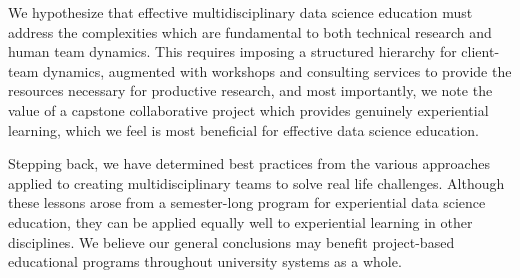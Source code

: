 \documentclass[12pt]{article}
\begin{document}
We hypothesize that effective multidisciplinary data science education must address the complexities which are fundamental to both technical research and human team dynamics. This requires imposing a structured hierarchy for client-team dynamics, augmented with workshops and consulting services to provide the resources necessary for productive research, and most importantly, we note the value of a capstone collaborative project which provides genuinely experiential learning, which we feel is most beneficial for effective data science education.

Stepping back, we have determined best practices from the various approaches applied to creating multidisciplinary teams to solve real life challenges.  Although these lessons arose from a semester-long program for experiential data science education, they can be applied equally well to experiential learning in other disciplines.  We believe our general conclusions may benefit project-based educational programs throughout university systems as a whole.



\newpage

%
%

\newpage
\printbibliography
\end{document}
